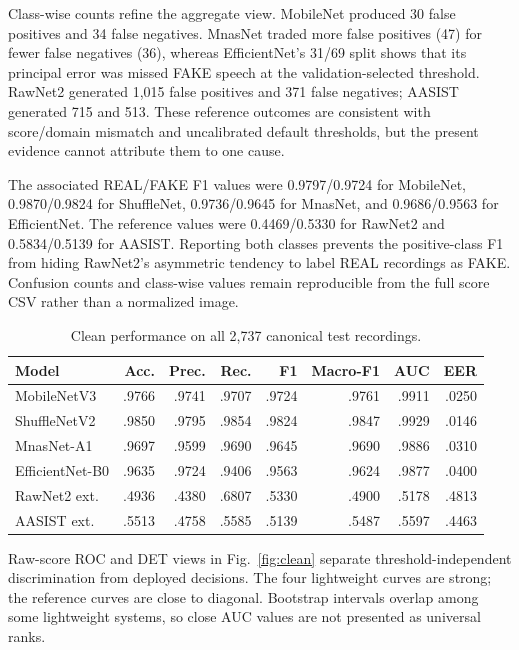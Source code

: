 \documentclass[10pt,journal,onecolumn,a4paper]{IEEEtran}
\begin{document}
Class-wise counts refine the aggregate view. MobileNet produced 30 false positives and 34 false negatives. MnasNet traded more false positives (47) for fewer false negatives (36), whereas EfficientNet's 31/69 split shows that its principal error was missed FAKE speech at the validation-selected threshold. RawNet2 generated 1,015 false positives and 371 false negatives; AASIST generated 715 and 513. These reference outcomes are consistent with score/domain mismatch and uncalibrated default thresholds, but the present evidence cannot attribute them to one cause.

The associated REAL/FAKE F1 values were 0.9797/0.9724 for MobileNet, 0.9870/0.9824 for ShuffleNet, 0.9736/0.9645 for MnasNet, and 0.9686/0.9563 for EfficientNet. The reference values were 0.4469/0.5330 for RawNet2 and 0.5834/0.5139 for AASIST. Reporting both classes prevents the positive-class F1 from hiding RawNet2's asymmetric tendency to label REAL recordings as FAKE. Confusion counts and class-wise values remain reproducible from the full score CSV rather than a normalized image.

\begin{table}[!t]
\centering\scriptsize
\caption{Clean performance on all 2,737 canonical test recordings.}
\label{tab:clean}
\begin{tabularx}{\textwidth}{l r r r r r r r}
\toprule
Model & Acc. & Prec. & Rec. & F1 & Macro-F1 & AUC & EER \\
\midrule
MobileNetV3 & .9766 & .9741 & .9707 & .9724 & .9761 & .9911 & .0250 \\
ShuffleNetV2 & .9850 & .9795 & .9854 & .9824 & .9847 & .9929 & .0146 \\
MnasNet-A1 & .9697 & .9599 & .9690 & .9645 & .9690 & .9886 & .0310 \\
EfficientNet-B0 & .9635 & .9724 & .9406 & .9563 & .9624 & .9877 & .0400 \\
RawNet2 ext. & .4936 & .4380 & .6807 & .5330 & .4900 & .5178 & .4813 \\
AASIST ext. & .5513 & .4758 & .5585 & .5139 & .5487 & .5597 & .4463 \\
\bottomrule
\end{tabularx}
\end{table}
Raw-score ROC and DET views in Fig.~\ref{fig:clean} separate threshold-independent discrimination from deployed decisions. The four lightweight curves are strong; the reference curves are close to diagonal. Bootstrap intervals overlap among some lightweight systems, so close AUC values are not presented as universal ranks.
\end{document}
